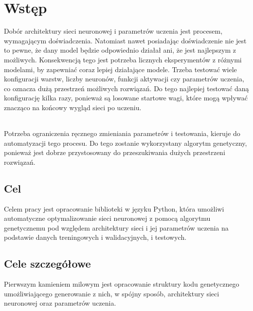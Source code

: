 \section{Wstęp}
Dobór architektury sieci neuronowej
i parametrów uczenia jest procesem,
wymagającym doświadczenia.
Natomiast nawet posiadając
doświadczenie nie jest to pewne,
że dany model będzie odpowiednio działał ani,
że jest najlepszym z możliwych.
Konsekwencją tego jest potrzeba licznych
eksperymentów z różnymi modelami,
by zapewniać coraz lepiej działające modele.
Trzeba testować wiele konfiguracji warstw,
liczby neuronów, funkcji aktywacji
czy parametrów uczenia,
co oznacza dużą przestrzeń możliwych rozwiązań.
Do tego najlepiej testować
daną konfigurację kilka razy,
ponieważ są losowane startowe wagi,
które mogą wpływać znacząco
na końcowy wygląd sieci po uczeniu.

\noindent\\
Potrzeba ograniczenia ręcznego
zmieniania parametrów i testowania,
kieruje do automatyzacji tego procesu.
Do tego zostanie wykorzystany algorytm genetyczny,
ponieważ jest dobrze przystosowany
do przeszukiwania dużych przestrzeni rozwiązań.

\subsection*{Cel}
Celem pracy jest opracowanie biblioteki
w języku Python, która umożliwi automatyczne
optymalizowanie sieci neuronowej
z pomocą algorytmu genetycznemu
pod względem architektury sieci
i jej parametrów uczenia
na podstawie danych treningowych
i walidacyjnych, i testowych.



\subsection*{Cele szczegółowe}
Pierwszym kamieniem milowym jest opracowanie struktury
kodu genetycznego umożliwiającego generowanie z nich,
w spójny sposób, architektury sieci neuronowej
oraz parametrów uczenia.

